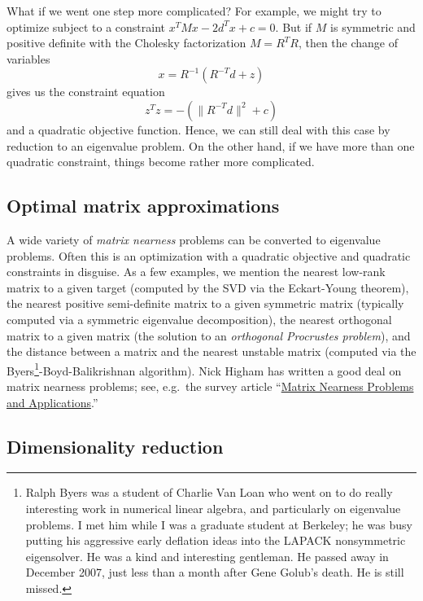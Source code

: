 \documentclass[12pt, leqno]{article} %
\begin{document}
What if we went one step more complicated?  For example, we might
try to optimize subject to a constraint $x^T M x - 2 d^T x + c = 0$.
But if $M$ is symmetric and positive definite with the Cholesky
factorization $M = R^T R$, then the change of variables
\[
  x = R^{-1} (R^{-T} d + z)
\]
gives us the constraint equation
\[
  z^T z = -\left( \|R^{-T} d\|^2 + c \right)
\]
and a quadratic objective function.  Hence, we can still deal with
this case by reduction to an eigenvalue problem.
On the other hand, if we have more than one quadratic constraint,
things become rather more complicated.

\subsection*{Optimal matrix approximations}

A wide variety of {\em matrix nearness} problems can be converted to
eigenvalue problems.  Often this is an optimization with a quadratic
objective and quadratic constraints in disguise.  As a few examples,
we mention the nearest low-rank matrix to a given target (computed by
the SVD via the Eckart-Young theorem), the nearest positive
semi-definite matrix to a given symmetric matrix (typically computed
via a symmetric eigenvalue decomposition), the nearest orthogonal
matrix to a given matrix (the solution to an {\em orthogonal
  Procrustes problem}), and the distance between a matrix and the
nearest unstable matrix (computed via the Byers\footnote{%
  Ralph Byers was a student of Charlie Van Loan who went on to do
  really interesting work in numerical linear algebra, and
  particularly on eigenvalue problems.  I met him while I was a
  graduate student at Berkeley; he was busy putting his aggressive
  early deflation ideas into the LAPACK nonsymmetric eigensolver.  He
  was a kind and interesting gentleman.  He passed away in December
  2007, just less than a month after Gene Golub's death. He is still
  missed.  }-Boyd-Balikrishnan algorithm).  Nick Higham has written
a good deal on matrix nearness problems; see, e.g.~the survey article
``\href{http://www.maths.manchester.ac.uk/~higham/narep/narep161.pdf}{Matrix Nearness Problems and Applications}.''

\subsection*{Dimensionality reduction}
\end{document}

